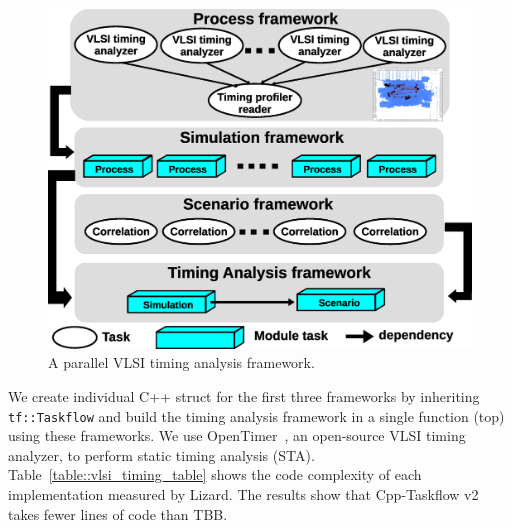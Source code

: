 \documentclass[conference]{IEEEtran}
\begin{document}
\begin{figure}[!h]
  \centering
  \includegraphics[width=.9\columnwidth]{Fig/vlsi_timing.eps}
  \caption{
    A parallel VLSI timing analysis framework.
  }
  \label{fig::vlsi_timing}
\end{figure}

We create individual C++ struct for the first three frameworks by inheriting \lstinline{tf::Taskflow}
and build the timing analysis framework in a single function (top) using these frameworks. 
We use OpenTimer~\cite{Huang_15_01}, an
open-source VLSI timing analyzer, to perform static timing analysis (STA). 
Table~\ref{table::vlsi_timing_table} shows the code complexity of each
implementation measured by Lizard.  The results show that Cpp-Taskflow v2 takes 
fewer lines of code than TBB.
\end{document}
